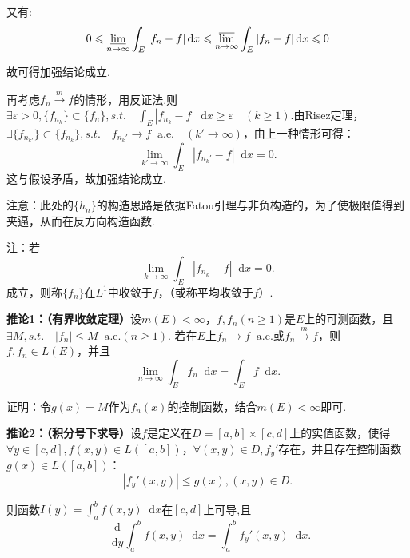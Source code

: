 \documentclass[bwprint, withoutpreface]{cumcmthesis}
\newcommand*{\dif}{\mathop{}\!\mathrm{d}}
\begin{document}
又有:
\begin{equation*}
	0 \leqslant \varliminf_{n \to \infty}{\int_E |f_n - f| \dif x} \leqslant \varlimsup_{n \to \infty}{\int_E |f_n - f| \dif x} \leqslant 0
\end{equation*}

故可得加强结论成立.

再考虑$f_n \stackrel{m}{\longrightarrow} f$的情形，用反证法.则$\exists \varepsilon > 0, \{f_{n_k}\} \subset \{f_n\}, s.t. \quad \int_E |f_{n_k} - f| \dif x \geqslant \varepsilon \quad (k \geqslant 1).$由Risez定理，$\exists \{f_{n_{k'}}\} \subset \{f_{n_k}\}, s.t. \quad f_{n_k'} \to f \mathop{} \! \mathrm{a.e.} \quad (k' \to \infty)$，由上一种情形可得：
\begin{equation*}
	\lim_{k' \to \infty}{\int_E |f_{n_k'} - f| \dif x} = 0.
\end{equation*}
这与假设矛盾，故加强结论成立.

注意：此处的$\{h_n\}$的构造思路是依据Fatou引理与非负构造的，为了使极限值得到夹逼，从而在反方向构造函数.

注：若
\begin{equation*}
	\lim_{k \to \infty}{\int_E |f_{n_k} - f| \dif x} = 0.
\end{equation*}
成立，则称$\{f_n\}$在$L^1$中收敛于$f$，（或称平均收敛于$f$）.

\textbf{推论1：（有界收敛定理）}设$m(E) < \infty$，$f, f_n(n \geqslant 1)$是$E$上的可测函数，且$\exists M, s.t. \quad |f_n| \leqslant M \mathop{} \! \mathrm{a.e.} (n \geqslant 1)$. 若在$E$上$f_n \to f \mathop{} \! \mathrm{a.e.}$或$f_n \stackrel{m}{\longrightarrow} f$，则$f, f_n \in L(E)$，并且
\begin{equation*}
	\lim_{n \to \infty} \int_E f_n \dif x = \int_E f \dif x.
\end{equation*}

证明：令$g(x) = M$作为$f_n(x)$的控制函数，结合$m(E) < \infty$即可.

\textbf{推论2：（积分号下求导）}设$f$是定义在$D = [a, b] \times [c, d]$上的实值函数，使得$\forall y \in [c, d], f(x, y) \in L([a, b])$，$\forall (x, y) \in D, {f_y}'$存在，并且存在控制函数$g(x) \in L([a, b])$：
\begin{equation*}
	|{f_y}'(x, y)| \leqslant g(x), (x, y) \in D.
\end{equation*}

则函数$I(y) = \int_{a}^{b} f(x, y) \dif x$在$[c, d]$上可导,且
\begin{equation}
	\frac{\dif}{\dif y} \int_{a}^{b} f(x, y) \dif x = \int_{a}^{b} {f_y}' (x, y) \dif x.
\end{equation}
\end{document}
